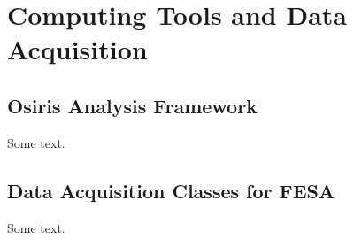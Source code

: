 %
%

\chapter{Computing Tools and Data Acquisition}
\label{Ch:Tools}

\section{Osiris Analysis Framework}
\label{Tools:OA}

Some text.

\section{Data Acquisition Classes for FESA}
\label{Tools:FESA}

Some text.

